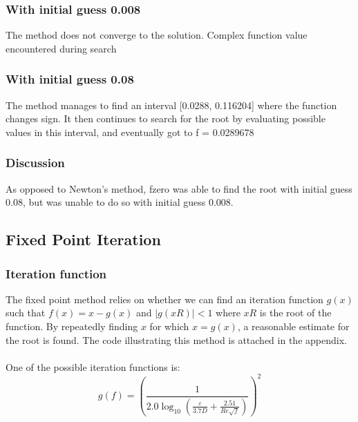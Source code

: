 \documentclass{book}
\begin{document}
    \subsubsection{With initial guess 0.008}
    The method does not converge to the solution. Complex function value encountered during search
    \subsubsection{With initial guess 0.08}
    The method manages to find an interval [0.0288, 0.116204] where the function changes sign. It then continues to search for the root by evaluating possible values in this interval, and eventually got to f = 0.0289678 
    \subsubsection{Discussion}
    As opposed to Newton's method, fzero was able to find the root with initial guess 0.08, but was unable to do so with initial guess 0.008.
    \subsection{Fixed Point Iteration}
    \subsubsection{Iteration function}
    The fixed point method relies on whether we can find an iteration function ${g(x)}$ such that ${f(x) = x - g(x)}$ and ${|g(xR)| < 1}$ where ${xR}$ is the root of the function. By repeatedly finding ${x}$ for which ${x = g(x)}$, a reasonable estimate for the root is found. The code illustrating this method is attached in the appendix.\\
    \\
    One of the possible iteration functions is: \\
    \[ g(f) = \left(\frac{1}{2.0 \log_{10} \left(\frac{\varepsilon}{3.7D} + \frac{2.51}{\textit{Re}\sqrt{f}}\right)}\right)^2 \]
\end{document}
